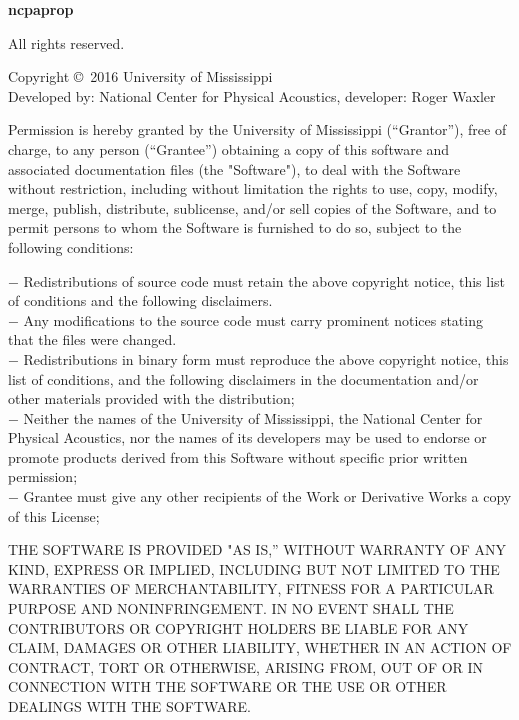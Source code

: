 
\begin{flushleft}

{\bf ncpaprop \version}

\begin{footnotesize}

All rights reserved.

\vspace{5pt}

Copyright \copyright\ 2016 University of Mississippi\\
Developed by: National Center for Physical Acoustics, developer: Roger Waxler

Permission is hereby granted by the University of Mississippi (“Grantor”), free of charge, to any person (“Grantee”) obtaining a copy of this software and associated documentation files (the "Software"), to deal with the Software without restriction, including without limitation the rights to use, copy, modify, merge, publish, distribute, sublicense, and/or sell copies of the Software, and to permit persons to whom the Software is furnished to do so, subject to the following conditions:

$-$ Redistributions of source code must retain the above copyright notice, this list of conditions and the following disclaimers.\\
$-$ Any modifications to the source code must carry prominent notices stating that the files were changed.\\
$-$ Redistributions in binary form must reproduce the above copyright notice, this list of conditions, and the following disclaimers in the documentation and/or other materials provided with the distribution;\\
$-$ Neither the names of the University of Mississippi, the National Center for Physical Acoustics, nor the names of its developers may be used to endorse or promote products derived from this Software without specific prior written permission;\\
$-$ Grantee must give any other recipients of the Work or Derivative Works a copy of this License;

THE SOFTWARE IS PROVIDED "AS IS,” WITHOUT WARRANTY OF ANY KIND, EXPRESS OR IMPLIED, INCLUDING BUT NOT LIMITED TO THE WARRANTIES OF MERCHANTABILITY, FITNESS FOR A PARTICULAR PURPOSE AND NONINFRINGEMENT. IN NO EVENT SHALL THE CONTRIBUTORS OR COPYRIGHT HOLDERS BE LIABLE FOR ANY CLAIM, DAMAGES OR OTHER LIABILITY, WHETHER IN AN ACTION OF CONTRACT, TORT OR OTHERWISE, ARISING FROM, OUT OF OR IN CONNECTION WITH THE SOFTWARE OR THE USE OR OTHER DEALINGS WITH THE SOFTWARE.


\end{footnotesize}


\end{flushleft} 
